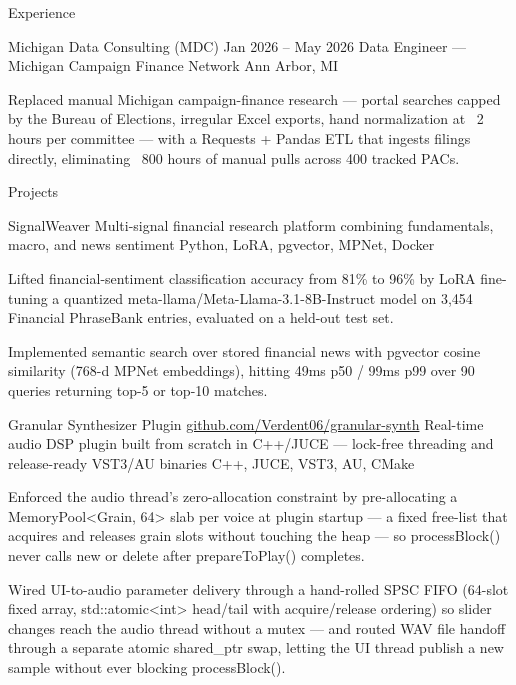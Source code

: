 \documentclass[
	11pt
]{../../../template}
\begin{document}
\begin{rSection}{E}{xperience}
		\begin{rSectionEntry}
			{Michigan Data Consulting (MDC)}
			{Jan 2026 -- May 2026}
			{Data Engineer --- Michigan Campaign Finance Network}
			{}
			{Ann Arbor, MI}

			\item Replaced manual Michigan campaign-finance research --- portal searches capped by the Bureau of Elections, irregular Excel exports, hand normalization at ~2 hours per committee --- with a Requests + Pandas ETL that ingests filings directly, eliminating ~800 hours of manual pulls across 400 tracked PACs.
		\end{rSectionEntry}
	\end{rSection}

	\begin{rSection}{P}{rojects}
		\begin{rSectionEntry}
			{SignalWeaver}
			{}
			{Multi-signal financial research platform combining fundamentals, macro, and news sentiment}
			{Python, LoRA, pgvector, MPNet, Docker}
			{}

			\item Lifted financial-sentiment classification accuracy from 81\% to 96\% by LoRA fine-tuning a quantized meta-llama/Meta-Llama-3.1-8B-Instruct model on 3,454 Financial PhraseBank entries, evaluated on a held-out test set.
			\item Implemented semantic search over stored financial news with pgvector cosine similarity (768-d MPNet embeddings), hitting 49ms p50 / 99ms p99 over 90 queries returning top-5 or top-10 matches.
		\end{rSectionEntry}

		\begin{rSectionEntry}
			{Granular Synthesizer Plugin}
			{\href{https://github.com/Verdent06/granular-synth}{github.com/Verdent06/granular-synth}}
			{Real-time audio DSP plugin built from scratch in C++/JUCE --- lock-free threading and release-ready VST3/AU binaries}
			{C++, JUCE, VST3, AU, CMake}
			{}

			\item Enforced the audio thread's zero-allocation constraint by pre-allocating a MemoryPool<Grain, 64> slab per voice at plugin startup --- a fixed free-list that acquires and releases grain slots without touching the heap --- so processBlock() never calls new or delete after prepareToPlay() completes.
			\item Wired UI-to-audio parameter delivery through a hand-rolled SPSC FIFO (64-slot fixed array, std::atomic<int> head/tail with acquire/release ordering) so slider changes reach the audio thread without a mutex --- and routed WAV file handoff through a separate atomic shared\_ptr swap, letting the UI thread publish a new sample without ever blocking processBlock().
		\end{rSectionEntry}
	\end{rSection}
\end{document}
